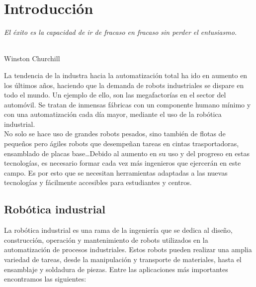 \chapter{Introducción}
\label{cap:capitulo1}
\setcounter{page}{1}

\begin{flushright}
\begin{minipage}[]{10cm}
\emph{El éxito es la capacidad de ir de fracaso en fracaso sin perder el entusiasmo.}\\
\end{minipage}\\

Winston Churchill\\
\end{flushright}

\vspace{1cm}

La tendencia de la industra hacia la automatización total ha ido en aumento en los últimos años, 
haciendo que la demanda de robots industriales se dispare en todo el mundo. Un ejemplo de ello, son 
las megafactorías en el sector del automóvil. Se tratan de inmensas fábricas con un componente humano
mínimo y con una automatización cada día mayor, mediante el uso de la robótica industrial. \\No solo se hace
uso de grandes robots pesados, sino también de flotas de pequeños pero ágiles robots que desempeñan tareas
en cintas trasportadoras, ensamblado de placas base\ldots  Debido al aumento en su uso y del progreso 
en estas tecnologías, es necesario formar cada vez más ingenieros que ejercerán en este campo. Es por esto que se 
necesitan herramientas adaptadas a las nuevas tecnologías y fácilmente accesibles para estudiantes y centros.    \\

\section{Robótica industrial}
\label{sec:miseccion} %

La robótica industrial es una rama de la ingeniería que se dedica al diseño, construcción, operación y mantenimiento 
de robots utilizados en la automatización de procesos industriales. Estos robots pueden realizar una amplia variedad 
de tareas, desde la manipulación y transporte de materiales, hasta el ensamblaje y soldadura de piezas. Entre las aplicaciones 
más importantes encontramos las siguientes:

